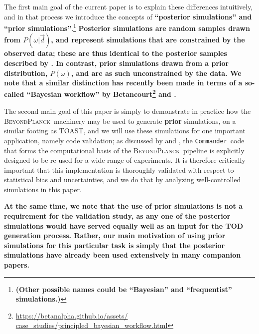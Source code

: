 \documentclass[twocolumn]{aa}%
\def\WMAP{\emph{WMAP}}
\def\commander{\texttt{Commander}}
\renewcommand{\d}[0]{\vec{d}}
\newcommand{\red}[0]{\color{red}}
\newcommand{\BP}{\textsc{BeyondPlanck}}
\begin{document}
The first main goal of the current paper is to explain these
differences intuitively, and in that process we introduce the concepts
of {\bf ``posterior simulations'' and ``prior
  simulations''}.\footnote{\bf (Other possible names could be
  ``Bayesian'' and ``frequentist'' simulations.)} {\bf Posterior
  simulations are random samples drawn from $P(\omega|\d)$, and
  represent simulations that are constrained by the observed data;
  these are thus identical to the posterior samples described by
  \citet{bp01}. In contrast, {\bf prior} simulations drawn from a
  prior distribution, $P(\omega)$, and are as such unconstrained by
  the data. We note that a similar distinction has recently been made in terms of a so-called ``Bayesian workflow'' by Betancourt\footnote{\url{https://betanalpha.github.io/assets/
case_studies/principled_bayesian_workflow.html}} and \citet{gelman:2020}.}

The second main goal of this paper is simply to demonstrate in
practice how the \BP\ machinery may be used to generate {\bf prior}
simulations, on a similar footing as TOAST, and we will use these
simulations for one important application, namely code validation; as
discussed by \citet{bp03} and \citet{bp05}, the \commander\ code that
forms the computational basis of the \BP\ pipeline is explicitly
designed to be re-used for a wide range of experiments. It is
therefore critically important that this implementation is thoroughly
validated with respect to statistical bias and uncertainties, and we
do that by analyzing well-controlled simulations in this paper.

{\bf At the same time, we note that the use of prior simulations is
  not a requirement for the validation study, as any one of the
  posterior simulations would have served equally well as an input for
  the TOD generation process. Rather, our main motivation of using
  prior simulations for this particular task is simply that the
  posterior simulations have already been used extensively in many
  companion papers.}

\end{document}
